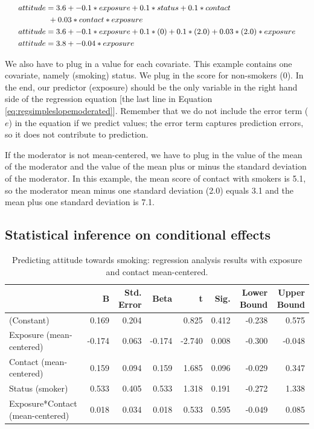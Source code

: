 \documentclass[a4paper]{book}
\theoremstyle{definition}
\theoremstyle{definition}
\theoremstyle{definition}
\theoremstyle{remark}
\begin{document}
\begin{equation}
\small
\begin{split}
  attitude &= 3.6 + -0.1*exposure + 0.1*status + 0.1*contact \\
  &\ + 0.03*contact*exposure \\
  attitude &= 3.6 + -0.1*exposure + 0.1*(0) + 0.1*(2.0) + 0.03*(2.0)*exposure \\
    attitude &= 3.8 + -0.04*exposure 
\end{split}
\label{eq:regsimpleslopemoderated} 
\normalsize
\end{equation}

We also have to plug in a value for each covariate. This example
contains one covariate, namely (smoking) status. We plug in the score
for non-smokers (0). In the end, our predictor (exposure) should be the
only variable in the right hand side of the regression equation {[}the
last line in Equation \eqref{eq:regsimpleslopemoderated}{]}. Remember that
we do not include the error term (\(e\)) in the equation if we predict
values; the error term captures prediction errors, so it does not
contribute to prediction.

If the moderator is not mean-centered, we have to plug in the value of
the mean of the moderator and the value of the mean plus or minus the
standard deviation of the moderator. In this example, the mean score of
contact with smokers is 5.1, so the moderator mean minus one standard
deviation (2.0) equals 3.1 and the mean plus one standard deviation is
7.1.

\subsection{Statistical inference on conditional
effects}\label{statistical-inference-on-conditional-effects}

\begin{table}

\caption{\label{tab:cont-moderator-output}Predicting attitude towards smoking: regression analysis results with exposure and contact mean-centered.}
\centering
\fontsize{8}{8}\selectfont
\begin{tabular}[t]{lrrrrrrr}
\hline
  & B & Std. Error & Beta & t & Sig. & Lower Bound & Upper Bound\\
\hline
(Constant) & 0.169 & 0.204 &  & 0.825 & 0.412 & -0.238 & 0.575\\
Exposure (mean-centered) & -0.174 & 0.063 & -0.174 & -2.740 & 0.008 & -0.300 & -0.048\\
Contact (mean-centered) & 0.159 & 0.094 & 0.159 & 1.685 & 0.096 & -0.029 & 0.347\\
Status (smoker) & 0.533 & 0.405 & 0.533 & 1.318 & 0.191 & -0.272 & 1.338\\
Exposure*Contact (mean-centered) & 0.018 & 0.034 & 0.018 & 0.533 & 0.595 & -0.049 & 0.085\\
\hline
\end{tabular}
\end{table}
\end{document}

